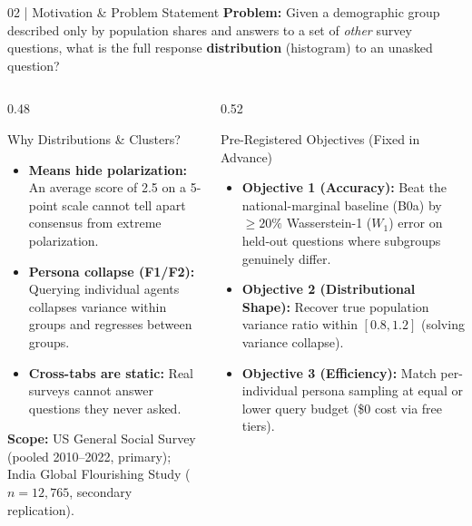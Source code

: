 \documentclass[10pt,aspectratio=169]{beamer}
\begin{document}
\begin{frame}{02 | Motivation \& Problem Statement}
    \small
    \textbf{Problem:} Given a demographic group described only by population shares and answers to a set of \emph{other} survey questions, what is the full response \textbf{distribution} (histogram) to an unasked question?

    \vspace{0.15cm}
    \begin{columns}[T]
        \begin{column}{0.48\textwidth}
            \begin{block}{Why Distributions \& Clusters?}
                \scriptsize
                \begin{itemize}\itemsep3pt
                    \item \textbf{Means hide polarization:} An average score of 2.5 on a 5-point scale cannot tell apart consensus from extreme polarization.
                    \item \textbf{Persona collapse (F1/F2):} Querying individual agents collapses variance within groups and regresses between groups.
                    \item \textbf{Cross-tabs are static:} Real surveys cannot answer questions they never asked.
                \end{itemize}
            \end{block}
            \vspace{0.05cm}
            \scriptsize \textbf{Scope:} US General Social Survey (pooled 2010--2022, primary); India Global Flourishing Study ($n=12{,}765$, secondary replication).
        \end{column}
        \begin{column}{0.52\textwidth}
            \begin{block}{Pre-Registered Objectives (Fixed in Advance)}
                \scriptsize
                \begin{itemize}\itemsep4pt
                    \item \textbf{Objective 1 (Accuracy):} Beat the national-marginal baseline (B0a) by $\ge 20\%$ Wasserstein-1 ($W_1$) error on held-out questions where subgroups genuinely differ.
                    \item \textbf{Objective 2 (Distributional Shape):} Recover true population variance ratio within $[0.8, 1.2]$ (solving variance collapse).
                    \item \textbf{Objective 3 (Efficiency):} Match per-individual persona sampling at equal or lower query budget (\$0 cost via free tiers).
                \end{itemize}
            \end{block}
        \end{column}
    \end{columns}
\end{frame}
\end{document}
